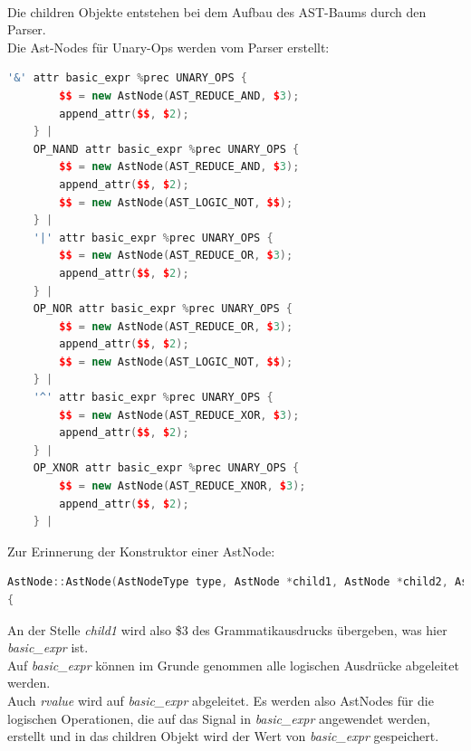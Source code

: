 \documentclass[11pt]{report}
\begin{document}
\\
Die children Objekte entstehen bei dem Aufbau des AST-Baums durch den Parser.
\\
Die Ast-Nodes für Unary-Ops werden vom Parser erstellt:
\begin{lstlisting}[language=C++]
'&' attr basic_expr %prec UNARY_OPS {
		$$ = new AstNode(AST_REDUCE_AND, $3);
		append_attr($$, $2);
	} |
	OP_NAND attr basic_expr %prec UNARY_OPS {
		$$ = new AstNode(AST_REDUCE_AND, $3);
		append_attr($$, $2);
		$$ = new AstNode(AST_LOGIC_NOT, $$);
	} |
	'|' attr basic_expr %prec UNARY_OPS {
		$$ = new AstNode(AST_REDUCE_OR, $3);
		append_attr($$, $2);
	} |
	OP_NOR attr basic_expr %prec UNARY_OPS {
		$$ = new AstNode(AST_REDUCE_OR, $3);
		append_attr($$, $2);
		$$ = new AstNode(AST_LOGIC_NOT, $$);
	} |
	'^' attr basic_expr %prec UNARY_OPS {
		$$ = new AstNode(AST_REDUCE_XOR, $3);
		append_attr($$, $2);
	} |
	OP_XNOR attr basic_expr %prec UNARY_OPS {
		$$ = new AstNode(AST_REDUCE_XNOR, $3);
		append_attr($$, $2);
	} |
\end{lstlisting}
Zur Erinnerung der Konstruktor einer AstNode:
\begin{lstlisting}[language=C++]
AstNode::AstNode(AstNodeType type, AstNode *child1, AstNode *child2, AstNode *child3)
{
\end{lstlisting}
An der Stelle \textit{child1} wird also \$3 des Grammatikausdrucks übergeben, was hier \textit{basic\_expr} ist.\\

Auf \textit{basic\_expr} können im Grunde genommen alle logischen Ausdrücke abgeleitet werden.\\
Auch \textit{rvalue} wird auf \textit{basic\_expr} abgeleitet.
Es werden also AstNodes für die logischen Operationen, die auf das Signal in \textit{basic\_expr} angewendet werden, erstellt und in das children Objekt wird der Wert von \textit{basic\_expr} gespeichert.

\end{document}

